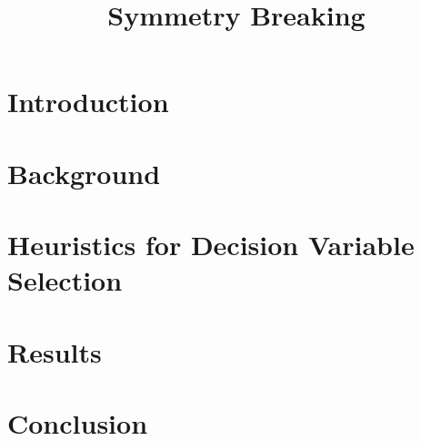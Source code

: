 

\title{Symmetry Breaking}


	\maketitle

	\listoftodos

	\begin{abstract}
	\end{abstract}

	\section{Introduction}
		\label{sec:Introduction}
		

	\section{Background}
		\label{sec:Background}
		

	\section{Heuristics for Decision Variable Selection}
		\label{sec:DecisionVars}
		

	\section{Results}
		\label{sec:Results}
		
	
	\section{Conclusion}
		\label{sec:Conclusion}
		

	\newpage
	
	

